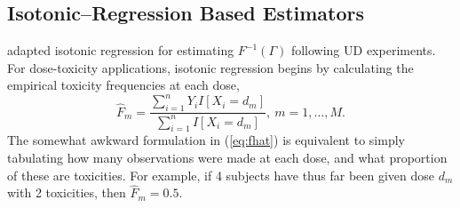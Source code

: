\subsection{Isotonic--Regression Based Estimators}

\cite{Styl:Flou:dose:2002} adapted isotonic regression \citep{BBBB:order:1972} for estimating $F^{-1}(\Gamma)$ following UD experiments. For dose-toxicity applications, isotonic regression begins by calculating the empirical toxicity frequencies at each dose,
%
\begin{equation}\label{eq:fhat}
\hat{F}_m=\frac{\sum_{i=1}^n Y_iI\left[X_i=d_m\right]}{\sum_{i=1}^n I\left[X_i=d_m\right]},\ m=1,\ldots,M.
\end{equation}
%
The somewhat awkward formulation in (\ref{eq:fhat}) is equivalent to simply tabulating how many observations were made at each dose, and what proportion of these are toxicities. For example, if 4 subjects have thus far been given dose $d_m$ with 2 toxicities, then $\hat{F}_m=0.5$.

